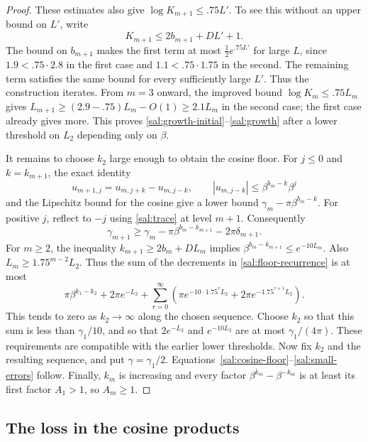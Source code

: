 \begin{proof}
These estimates also give $\log K_{m+1}\le .75L'$.  To see this
without an upper bound on $L'$, write
\[
 K_{m+1}\le2b_{m+1}+DL'+1.
\]
The bound on $b_{m+1}$ makes the first term at most
$\tfrac12e^{.75L'}$ for large $L$, since
$1.9<.75\cdot2.8$ in the first case and
$1.1<.75\cdot1.75$ in the second.  The remaining term satisfies the
same bound for every sufficiently large $L'$.  Thus the construction
iterates.  From $m=3$ onward, the improved bound
$\log K_m\le .75L_m$ gives
$L_{m+1}\ge(2.9-.75)L_m-O(1)\ge2.1L_m$ in the second case; the
first case already gives more.  This proves
\eqref{sal:growth-initial}--\eqref{sal:growth} after a lower threshold
on $L_2$ depending only on $\beta$.

It remains to choose $k_2$ large enough to obtain the cosine floor.
For $j\le0$ and $k=k_{m+1}$, the exact identity
\begin{equation}\label{sal:shift}
 u_{m+1,j}=u_{m,j+k}-u_{m,j-k},\qquad
 |u_{m,j-k}|\le\beta^{b_m-k}\beta^j
\end{equation}
and the Lipschitz bound for the cosine give a lower bound
$\gamma_m-\pi\beta^{b_m-k}$.
For positive $j$, reflect to $-j$ using \eqref{sal:trace} at level
$m+1$.  Consequently
\begin{equation}\label{sal:floor-recurrence}
 \gamma_{m+1}\ge\gamma_m
              -\pi\beta^{b_m-k_{m+1}}-2\pi\delta_{m+1}.
\end{equation}
For $m\ge2$, the inequality $k_{m+1}\ge2b_m+DL_m$ implies
$\beta^{b_m-k_{m+1}}\le e^{-10L_m}$.  Also
$L_m\ge1.75^{m-2}L_2$.  Thus the sum of the decrements in
\eqref{sal:floor-recurrence} is at most
\[
 \pi\beta^{k_1-k_2}+2\pi e^{-L_2}
 +\sum_{r=0}^{\infty}
   \left(\pi e^{-10\cdot1.75^rL_2}
         +2\pi e^{-1.75^{r+1}L_2}\right).
\]
This tends to zero as $k_2\to\infty$ along the chosen sequence.
Choose $k_2$ so that this sum is less than $\gamma_1/10$, and so that
$2e^{-L_2}$ and $e^{-10L_2}$ are at most $\gamma_1/(4\pi)$.
These requirements are compatible with the earlier lower thresholds.
Now fix $k_2$ and the resulting sequence, and put $\gamma=\gamma_1/2$.
Equations~\eqref{sal:cosine-floor}--\eqref{sal:small-errors} follow.
Finally, $k_m$ is increasing and every factor
$\beta^{k_m}-\beta^{-k_m}$ is at least its first factor $A_1>1$,
so $A_m\ge1$.
\end{proof}

\subsection{The loss in the cosine products}

